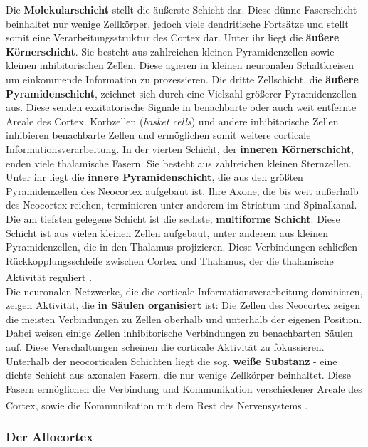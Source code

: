 \documentclass[12pt,a4paper,pdftex]{article}
\begin{document}
\noindent Die \textbf{Molekularschicht} stellt die äußerste Schicht dar. Diese dünne Faserschicht beinhaltet nur wenige Zellkörper, jedoch viele dendritische Fortsätze und stellt somit eine Verarbeitungsstruktur des Cortex dar. Unter ihr liegt die \textbf{äußere Körnerschicht}. Sie besteht aus zahlreichen kleinen Pyramidenzellen sowie kleinen inhibitorischen Zellen. Diese agieren in kleinen neuronalen Schaltkreisen um einkommende Information zu prozessieren. Die dritte Zellschicht, die \textbf{äußere Pyramidenschicht}, zeichnet sich durch eine Vielzahl größerer Pyramidenzellen aus. Diese senden exzitatorische Signale in benachbarte oder auch weit entfernte Areale des Cortex. Korbzellen (\textit{basket cells})  und andere inhibitorische Zellen inhibieren benachbarte Zellen und ermöglichen somit weitere corticale Informationsverarbeitung. In der vierten Schicht, der \textbf{inneren Körnerschicht}, enden viele thalamische Fasern. Sie besteht aus zahlreichen kleinen Sternzellen. Unter ihr liegt die \textbf{innere Pyramidenschicht}, die aus den größten Pyramidenzellen des Neocortex aufgebaut ist. Ihre Axone, die bis weit außerhalb des Neocortex reichen, terminieren unter anderem im Striatum und Spinalkanal. Die am tiefsten gelegene Schicht ist die sechste, \textbf{multiforme Schicht}. Diese Schicht ist aus vielen kleinen Zellen aufgebaut, unter anderem aus kleinen Pyramidenzellen, die in den Thalamus projizieren. Diese Verbindungen schließen Rückkopplungsschleife zwischen Cortex und Thalamus, der die thalamische Aktivität reguliert \textsuperscript{\cite[7]{watson2010thebrain}}.\\
Die neuronalen Netzwerke, die die corticale Informationsverarbeitung dominieren, zeigen Aktivität, die \textbf{in Säulen organisiert} ist: Die Zellen des Neocortex zeigen die meisten Verbindungen zu Zellen oberhalb und unterhalb der eigenen Position. Dabei weisen einige Zellen inhibitorische Verbindungen zu benachbarten Säulen auf. Diese Verschaltungen scheinen die corticale Aktivität zu fokussieren.\\
\noindent Unterhalb der neocorticalen Schichten liegt die sog. \textbf{weiße Substanz} - eine dichte Schicht aus axonalen Fasern, die nur wenige Zellkörper beinhaltet. Diese Fasern ermöglichen die Verbindung und Kommunikation verschiedener Areale des Cortex, sowie die Kommunikation mit dem Rest des Nervensystems \textsuperscript{\cite[7]{watson2010thebrain}}.

\subsubsection*{Der Allocortex} 
\end{document}
